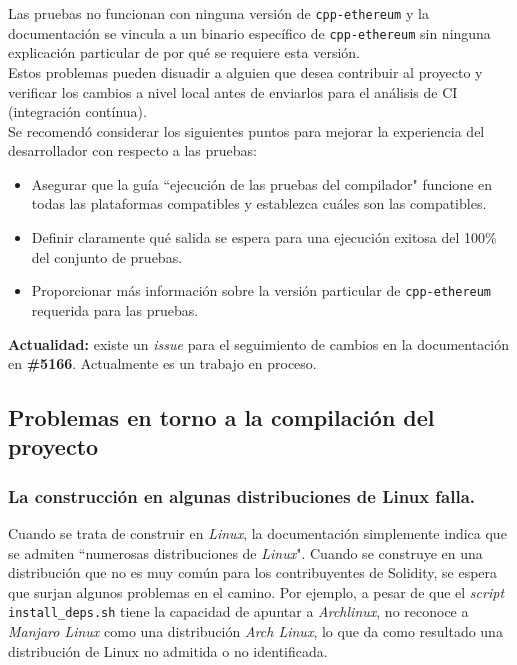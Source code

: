 Las pruebas no funcionan con ninguna versión de \verb|cpp-ethereum| y la documentación se vincula a un binario específico de \verb|cpp-ethereum| sin ninguna explicación particular de por qué se requiere esta versión.\\

Estos problemas pueden disuadir a alguien que desea contribuir al proyecto y verificar los cambios a nivel local antes de enviarlos para el análisis de CI (integración contínua).\\

Se recomendó considerar los siguientes puntos para mejorar la experiencia del desarrollador con respecto a las pruebas:
\begin{itemize}
  \item Asegurar que la guía ``ejecución de las pruebas del compilador" funcione en todas las plataformas compatibles y establezca cuáles son las compatibles.
  \item Definir claramente qué salida se espera para una ejecución exitosa del 100\% del conjunto de pruebas.
  \item Proporcionar más información sobre la versión particular de \verb|cpp-ethereum| requerida para las pruebas.
\end{itemize}

\textbf{Actualidad:} existe un \textit{issue} para el seguimiento de cambios en la documentación en \textbf{\#5166}\cite{GHI5166}. Actualmente es un trabajo en proceso.\\

\subsection{Problemas en torno a la compilación del proyecto}

\subsubsection{La construcción en algunas distribuciones de Linux falla.}
Cuando se trata de construir en \textit{Linux}, la documentación simplemente indica que se admiten ``numerosas distribuciones de \textit{Linux}"\cite{SolidityRTDExternalDeps}. Cuando se construye en una distribución que no es muy común para los contribuyentes de Solidity, se espera que surjan algunos problemas en el camino. Por ejemplo, a pesar de que el \textit{script} \verb|install_deps.sh|\cite{SolidityScriptInstallDeps} tiene la capacidad de apuntar a \textit{Archlinux}, no reconoce a \textit{Manjaro Linux} como una distribución \textit{Arch Linux}, lo que da como resultado una distribución de Linux no admitida o no identificada.\\

